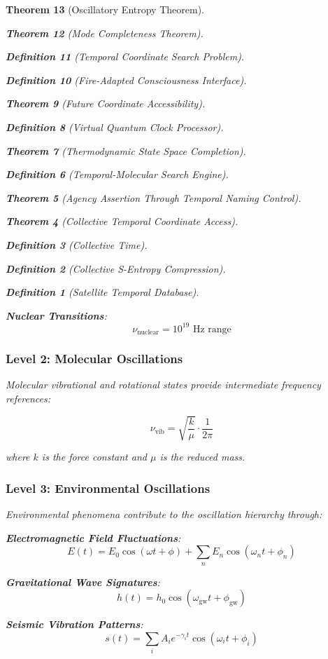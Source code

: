 \documentclass[12pt,a4paper]{article}
\newtheorem{theorem}{Theorem}[section]
\newtheorem{definition}[theorem]{Definition}
\begin{document}
\begin{theorem}[Oscillatory Entropy Theorem]
\begin{theorem}[Mode Completeness Theorem]
\begin{enumerate}
\begin{definition}[Temporal Coordinate Search Problem]
\begin{algorithm}
\begin{definition}[Fire-Adapted Consciousness Interface]
\begin{theorem}[Future Coordinate Accessibility]
\begin{definition}[Virtual Quantum Clock Processor]
\begin{itemize}
\begin{itemize}
\begin{theorem}[Thermodynamic State Space Completion]
\begin{definition}[Temporal-Molecular Search Engine]
\begin{theorem}[Agency Assertion Through Temporal Naming Control]
\begin{remark}
\begin{theorem}[Collective Temporal Coordinate Access]
\begin{definition}[Collective Time]
\begin{definition}[Collective S-Entropy Compression]
\begin{definition}[Satellite Temporal Database]
\begin{algorithm}
\begin{table}[h]
{{\textbf{Nuclear Transitions}:
\begin{equation}
\nu_{\text{nuclear}} = 10^{19} \text{ Hz range}
\end{equation}

\subsubsection{Level 2: Molecular Oscillations}

Molecular vibrational and rotational states provide intermediate frequency references:

\begin{equation}
\nu_{\text{vib}} = \sqrt{\frac{k}{\mu}} \cdot \frac{1}{2\pi}
\end{equation}

where $k$ is the force constant and $\mu$ is the reduced mass.

\subsubsection{Level 3: Environmental Oscillations}

Environmental phenomena contribute to the oscillation hierarchy through:

\textbf{Electromagnetic Field Fluctuations}:
\begin{equation}
E(t) = E_0 \cos(\omega t + \phi) + \sum_{n} E_n \cos(\omega_n t + \phi_n)
\end{equation}

\textbf{Gravitational Wave Signatures}:
\begin{equation}
h(t) = h_0 \cos(\omega_{\text{gw}} t + \phi_{\text{gw}})
\end{equation}

\textbf{Seismic Vibration Patterns}:
\begin{equation}
s(t) = \sum_{i} A_i e^{-\gamma_i t} \cos(\omega_i t + \phi_i)
\end{equation}

}}
\end{table}
\end{algorithm}
\end{definition}
\end{definition}
\end{definition}
\end{theorem}
\end{remark}
\end{theorem}
\end{definition}
\end{theorem}
\end{itemize}
\end{itemize}
\end{definition}
\end{theorem}
\end{definition}
\end{algorithm}
\end{definition}
\end{enumerate}
\end{theorem}
\end{theorem}
\end{document}
